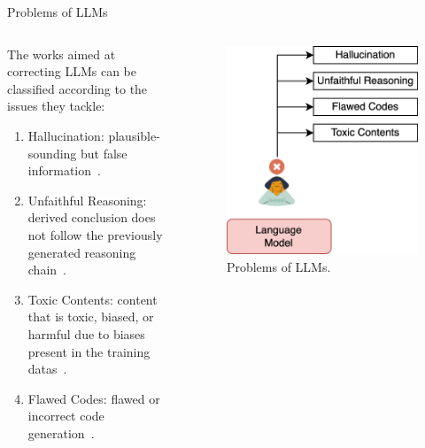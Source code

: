 \begin{frame}{Problems of LLMs}
    \begin{columns}[T]
        \begin{column}{0.70\textwidth}
            The works aimed at correcting LLMs can be classified according to the issues they tackle:
            \begin{enumerate}
                \item Hallucination: plausible-sounding but false information~\cite{gao2023rarr, zhang2023language}.

                \item Unfaithful Reasoning: derived conclusion does not follow the previously generated reasoning chain~\cite{he2022rethinking, pan2023logiclm}.

                \item Toxic Contents: content that is toxic, biased, or harmful due to biases present in the training datas~\cite{lu2022quark, gou2023critic}.

                \item Flawed Codes: flawed or incorrect code generation~\cite{chen2023teaching, olausson2023selfrepair}.
            \end{enumerate}
        \end{column}
        \begin{column}{0.30\textwidth}
            \begin{figure}[!htb]
                \centering
                \includegraphics[width=1\textwidth]{img/language_model}
                \captionsetup{font=small,labelformat=empty}
                \caption{Problems of LLMs.}
            \end{figure}
        \end{column}
    \end{columns}
\end{frame}


